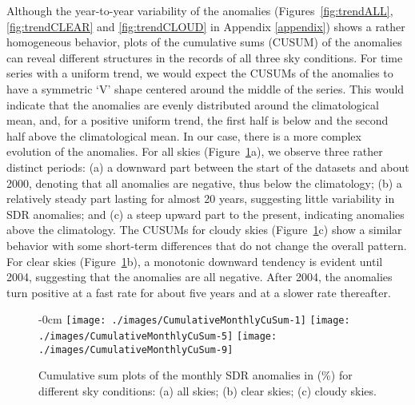 \documentclass[applsci,article,submit,moreauthors,pdftex]{Definitions/mdpi}
\begin{document}
Although the year-to-year variability of the anomalies
(Figures~\ref{fig:trendALL}, \ref{fig:trendCLEAR} and
\ref{fig:trendCLOUD} in Appendix \ref{appendix}) shows a rather
homogeneous behavior, plots of the cumulative sums (CUSUM)
\citep{Regier2019} of the anomalies can reveal different structures in
the records of all three sky conditions. For time series with a uniform
trend, we would expect the CUSUMs of the anomalies to have a symmetric
`V' shape centered around the middle of the series. This would indicate
that the anomalies are evenly distributed around the climatological
mean, and, for a positive uniform trend, the first half is below and the
second half above the climatological mean. In our case, there is a more
complex evolution of the anomalies. For all skies
(Figure~\ref{fig:cusummonth}a), we observe three rather distinct
periods: (a) a downward part between the start of the datasets and about
2000, denoting that all anomalies are negative, thus below the
climatology; (b) a relatively steady part lasting for almost 20 years,
suggesting little variability in SDR anomalies; and (c) a steep upward
part to the present, indicating anomalies above the climatology. The
CUSUMs for cloudy skies (Figure~\ref{fig:cusummonth}c) show a similar
behavior with some short-term differences that do not change the overall
pattern. For clear skies (Figure~\ref{fig:cusummonth}b), a monotonic
downward tendency is evident until 2004, suggesting that the anomalies
are all negative. After 2004, the anomalies turn positive at a fast rate
for about five years and at a slower rate thereafter.

\begin{figure}[h!]
    \begin{adjustwidth}{-\extralength}{0cm}
        {\centering 
            {\texttt{[image: ./images/CumulativeMonthlyCuSum-1]}}\hfill
            {\texttt{[image: ./images/CumulativeMonthlyCuSum-5]}}\hfill
            {\texttt{[image: ./images/CumulativeMonthlyCuSum-9]}}
        }
    \end{adjustwidth}
\caption{Cumulative sum plots of the monthly SDR anomalies in (\%) for different sky conditions: (a) all skies; (b) clear skies; (c) cloudy skies.}\label{fig:cusummonth}
\end{figure}

\vspace{-6pt}
\end{document}
